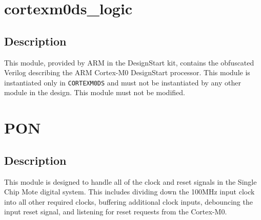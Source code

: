 \section{cortexm0ds\_logic}
\subsection{Description}
This module, provided by ARM in the DesignStart kit, contains the obfuscated Verilog describing the ARM Cortex-M0 DesignStart processor. This module is instantiated only in \texttt{CORTEXM0DS} and must not be instantiated by any other module in the design. This module must not be modified.

\section{PON} \label{PON}
\subsection{Description}
This module is designed to handle all of the clock and reset signals in the Single Chip Mote digital system. This includes dividing down the 100MHz input clock into all other required clocks, buffering additional clock inputs, debouncing the input reset signal, and listening for reset requests from the Cortex-M0.

